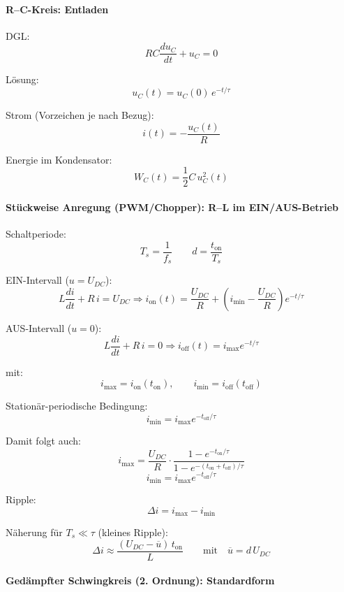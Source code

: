 
\paragraph{R--C-Kreis: Entladen}

DGL:
\[
RC\frac{du_C}{dt}+u_C=0
\]

Lösung:
\[
\boxed{u_C(t)=u_C(0)\,e^{-t/\tau}}
\]

Strom (Vorzeichen je nach Bezug):
\[
\boxed{i(t)=-\frac{u_C(t)}{R}}
\]

Energie im Kondensator:
\[
\boxed{W_C(t)=\frac{1}{2}C\,u_C^2(t)}
\]


\paragraph{Stückweise Anregung (PWM/Chopper): R--L im EIN/AUS-Betrieb}

Schaltperiode:
\[
\boxed{T_s=\frac{1}{f_s}}
\qquad
\boxed{d=\frac{t_{\mathrm{on}}}{T_s}}
\]

EIN-Intervall ($u=U_{DC}$):
\[
L\frac{di}{dt}+R\,i=U_{DC}
\Rightarrow
\boxed{
i_{\mathrm{on}}(t)=\frac{U_{DC}}{R}+\left(i_{\min}-\frac{U_{DC}}{R}\right)e^{-t/\tau}
}
\]

AUS-Intervall ($u=0$):
\[
L\frac{di}{dt}+R\,i=0
\Rightarrow
\boxed{
i_{\mathrm{off}}(t)=i_{\max}e^{-t/\tau}
}
\]

mit:
\[
\boxed{i_{\max}=i_{\mathrm{on}}(t_{\mathrm{on}})},
\qquad
\boxed{i_{\min}=i_{\mathrm{off}}(t_{\mathrm{off}})}
\]

Stationär-periodische Bedingung:
\[
\boxed{i_{\min}=i_{\max}e^{-t_{\mathrm{off}}/\tau}}
\]

Damit folgt auch:
\[
\boxed{i_{\max}=\frac{U_{DC}}{R}\cdot
\frac{1-e^{-t_{\mathrm{on}}/\tau}}{1-e^{-(t_{\mathrm{on}}+t_{\mathrm{off}})/\tau}}
}
\]
\[
\boxed{i_{\min}=i_{\max}e^{-t_{\mathrm{off}}/\tau}}
\]

Ripple:
\[
\boxed{\Delta i=i_{\max}-i_{\min}}
\]

Näherung für $T_s\ll\tau$ (kleines Ripple):
\[
\boxed{\Delta i\approx\frac{(U_{DC}-\overline{u})\,t_{\mathrm{on}}}{L}}
\qquad
\text{mit}\quad
\boxed{\overline{u}=d\,U_{DC}}
\]


\paragraph{Gedämpfter Schwingkreis (2. Ordnung): Standardform}

